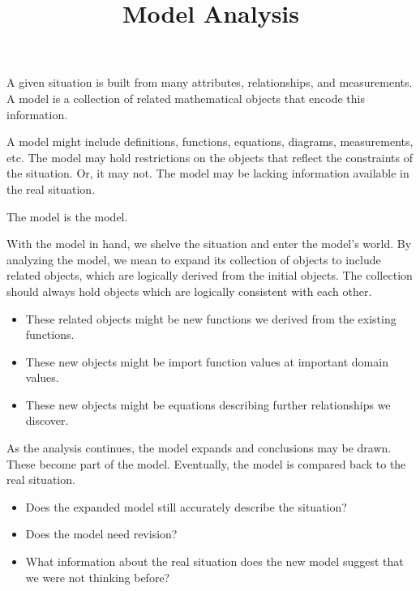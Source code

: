\documentclass{ximera}
\title{Model Analysis}
\begin{document}
\begin{abstract}
\end{abstract}
\maketitle






A given situation is built from many attributes, relationships, and measurements. A model is a collection of related mathematical objects that encode this information.

A model might include definitions, functions, equations, diagrams, measurements, etc. The model may hold restrictions on the objects that reflect the constraints of the situation.  Or, it may not. The model may be lacking information available in the real situation.

The model is the model.

With the model in hand, we shelve the situation and enter the model's world. By analyzing the model, we mean to expand its collection of objects to include related objects, which are logically derived from the initial objects.  The collection should always hold objects which are logically consistent with each other.

\begin{itemize}
\item These related objects might be new functions we derived from the existing functions.
\item These new objects might be import function values at important domain values.
\item These new objects might be equations describing further relationships we discover.
\end{itemize}

As the analysis continues, the model expands and conclusions may be drawn.  These become part of the model. Eventually, the model is compared back to the real situation.  



\begin{itemize}
\item Does the expanded model still accurately describe the situation?
\item Does the model need revision?
\item What information about the real situation does the new model suggest that we were not thinking before?
\end{itemize}
\end{document}
